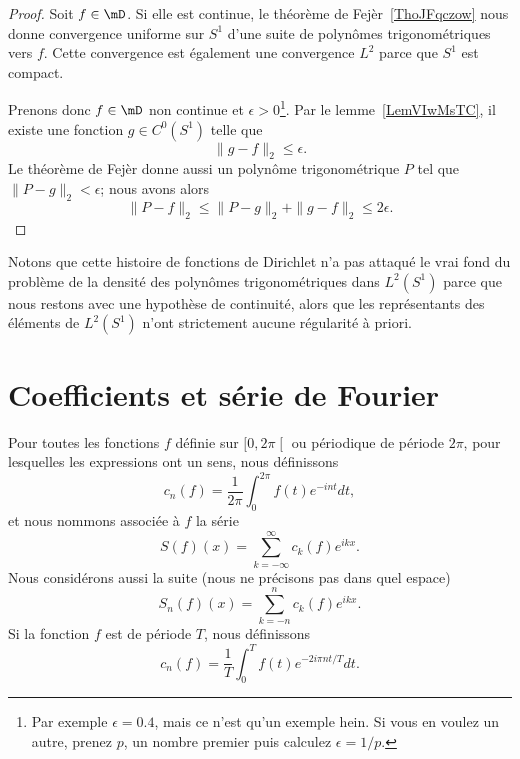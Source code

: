 \begin{proof}
	Soit \( f\in\mD\). Si elle est continue, le théorème de Fejèr~\ref{ThoJFqczow} nous donne convergence uniforme sur \( S^1\) d'une suite de polynômes trigonométriques vers \( f\). Cette convergence est également une convergence \( L^2\) parce que \( S^1\) est compact.

	Prenons donc \( f\in \mD\) non continue et \( \epsilon>0\)\footnote{Par exemple \( \epsilon=0.4\), mais ce n'est qu'un exemple hein. Si vous en voulez un autre, prenez \( p\), un nombre premier puis calculez \( \epsilon=1/p\).}. Par le lemme~\ref{LemVIwMsTC}, il existe une fonction \( g\in C^0(S^1)\) telle que
	\begin{equation}
		\| g-f \|_2\leq \epsilon.
	\end{equation}
	Le théorème de Fejèr donne aussi un polynôme trigonométrique \( P\) tel que \( \| P-g \|_2<\epsilon\); nous avons alors
	\begin{equation}
		\| P-f \|_2\leq \| P-g \|_{2}+\| g-f \|_2\leq 2\epsilon.
	\end{equation}
\end{proof}

Notons que cette histoire de fonctions de Dirichlet n'a pas attaqué le vrai fond du problème de la densité des polynômes trigonométriques dans \(  L^2(S^1)\) parce que nous restons avec une hypothèse de continuité, alors que les représentants des éléments de \( L^2(S^1)\) n'ont strictement aucune régularité à priori.

\section{Coefficients et série de Fourier}

\begin{definition}      \label{DEFooJUUIooNMdCtN}
	Pour toutes les fonctions \( f\) définie sur \( \mathopen[ 0 , 2\pi \mathclose[\) ou périodique de période \( 2\pi\), pour lesquelles les expressions ont un sens, nous définissons
	\begin{equation}    \label{EqNDBaXRL}
		c_n(f)=\frac{1}{ 2\pi }\int_0^{2\pi}f(t) e^{-int}dt,
	\end{equation}
	et nous nommons  associée à \( f\) la série
	\begin{equation}
		S(f)(x)=\sum_{k=-\infty}^{\infty}c_k(f) e^{ikx}.
	\end{equation}
	Nous considérons aussi la suite (nous ne précisons pas dans quel espace)
	\begin{equation}
		S_n(f)(x)=\sum_{k=-n}^nc_k(f) e^{ikx}.
	\end{equation}
	Si la fonction \( f\) est de période \( T\), nous définissons
	\begin{equation}        \label{EQooBOFSooFCJXzu}
		c_n(f)=\frac{1}{ T }\int_0^Tf(t) e^{-2 i \pi n t/T}dt.
	\end{equation}
\end{definition}

